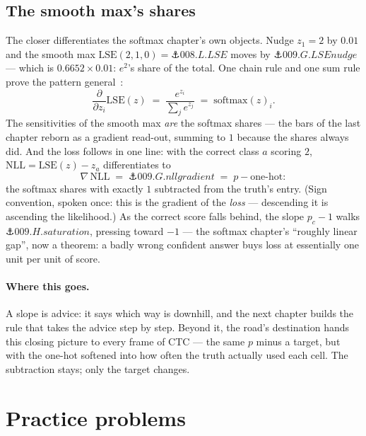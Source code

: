 \begin{narrative}
\section{The smooth max's shares}

The closer differentiates the softmax chapter's own objects. Nudge
$z_1 = 2$ by $0.01$ and the smooth max $\mathrm{LSE}(2, 1, 0) =
\anchor{008.L.LSE}$ moves by $\anchor{009.G.LSEnudge}$ — which is
$0.6652 \times 0.01$: $e^2$'s share of the total. One chain rule and
one sum rule prove the pattern
general~\cite{calculus-lawrence-murray-gradients-of-softmax-and-logsumexp}:
\[
  \frac{\partial}{\partial z_i} \mathrm{LSE}(z)
  \;=\; \frac{e^{z_i}}{\sum_j e^{z_j}}
  \;=\; \mathrm{softmax}(z)_i .
\]
The sensitivities of the smooth max \emph{are} the softmax shares —
the bars of the last chapter reborn as a gradient read-out, summing
to $1$ because the shares always did. And the loss follows in one
line: with the correct class $a$ scoring $2$,
$\mathrm{NLL} = \mathrm{LSE}(z) - z_a$ differentiates to
\[
  \nabla\,\mathrm{NLL} \;=\; \anchor{009.G.nllgradient}
  \;=\; p - \text{one-hot} :
\]
the softmax shares with exactly $1$ subtracted from the truth's
entry. (Sign convention, spoken once: this is the gradient of the
\emph{loss} — descending it is ascending the likelihood.) As the
correct score falls behind, the slope $p_c - 1$ walks
$\anchor{009.H.saturation}$, pressing toward $-1$ — the softmax
chapter's ``roughly linear gap'', now a theorem: a badly wrong
confident answer buys loss at essentially one unit per unit of score.

\paragraph{Where this goes.} A slope is advice: it says which way is
downhill, and the next chapter builds the rule that takes the advice
step by step. Beyond it, the road's destination hands this closing
picture to every frame of CTC — the same $p$ minus a target, but with
the one-hot softened into how often the truth actually used each
cell. The subtraction stays; only the target changes.
\end{narrative}

\section*{Practice problems}

